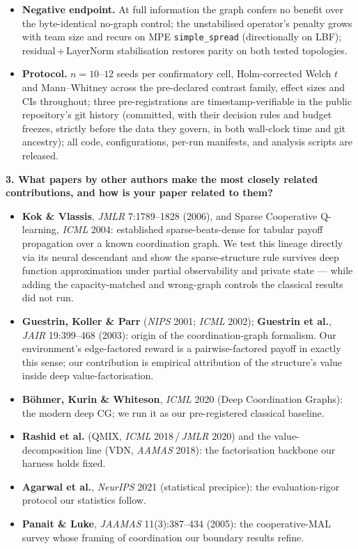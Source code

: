 \documentclass[10pt,a4paper]{article}
\newcommand{\Q}[1]{\vspace{4pt}\textbf{#1}\par\vspace{1pt}}
\begin{document}
\begin{itemize}
\item \textbf{Negative endpoint.} At full information the graph confers no
benefit over the byte-identical no-graph control; the unstabilised operator's
penalty grows with team size and recurs on MPE \texttt{simple\_spread}
(directionally on LBF); residual\,+\,LayerNorm stabilisation restores parity on
both tested topologies.

\item \textbf{Protocol.} $n = 10$--$12$ seeds per confirmatory cell,
Holm-corrected Welch $t$ and Mann--Whitney across the pre-declared contrast
family, effect sizes and CIs throughout; three pre-registrations are
timestamp-verifiable in the public repository's git history (committed, with
their decision rules and budget freezes, strictly before the data they govern,
in both wall-clock time and git ancestry); all code, configurations, per-run
manifests, and analysis scripts are released.
\end{itemize}

\Q{3. What papers by other authors make the most closely related contributions,
and how is your paper related to them?}

\begin{itemize}
\item \textbf{Kok \& Vlassis}, \textit{JMLR} 7:1789--1828 (2006), and Sparse
Cooperative Q-learning, \textit{ICML} 2004: established sparse-beats-dense for
tabular payoff propagation over a known coordination graph. We test this lineage
directly via its neural descendant and show the sparse-structure rule survives
deep function approximation under partial observability and private state ---
while adding the capacity-matched and wrong-graph controls the classical results
did not run.
\item \textbf{Guestrin, Koller \& Parr} (\textit{NIPS} 2001; \textit{ICML}
2002); \textbf{Guestrin et al.}, \textit{JAIR} 19:399--468 (2003): origin of the
coordination-graph formalism. Our environment's edge-factored reward is a
pairwise-factored payoff in exactly this sense; our contribution is empirical
attribution of the structure's value inside deep value-factorisation.
\item \textbf{B\"ohmer, Kurin \& Whiteson}, \textit{ICML} 2020 (Deep
Coordination Graphs): the modern deep CG; we run it as our pre-registered
classical baseline.
\item \textbf{Rashid et al.} (QMIX, \textit{ICML} 2018\,/\,\textit{JMLR} 2020)
and the value-decomposition line (VDN, \textit{AAMAS} 2018): the factorisation
backbone our harness holds fixed.
\item \textbf{Agarwal et al.}, \textit{NeurIPS} 2021 (statistical precipice):
the evaluation-rigor protocol our statistics follow.
\item \textbf{Panait \& Luke}, \textit{JAAMAS} 11(3):387--434 (2005): the
cooperative-MAL survey whose framing of coordination our boundary results refine.
\end{itemize}
\end{document}
